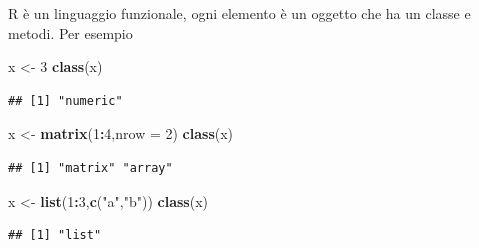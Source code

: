 \documentclass[
  11pt,
]{book}
\newenvironment{Shaded}{\begin{snugshade}}{\end{snugshade}}
\newcommand{\AttributeTok}[1]{\textcolor[rgb]{0.13,0.29,0.53}{#1}}
\newcommand{\DecValTok}[1]{\textcolor[rgb]{0.00,0.00,0.81}{#1}}
\newcommand{\FunctionTok}[1]{\textcolor[rgb]{0.13,0.29,0.53}{\textbf{#1}}}
\newcommand{\NormalTok}[1]{#1}
\newcommand{\OtherTok}[1]{\textcolor[rgb]{0.56,0.35,0.01}{#1}}
\newcommand{\SpecialCharTok}[1]{\textcolor[rgb]{0.81,0.36,0.00}{\textbf{#1}}}
\newcommand{\StringTok}[1]{\textcolor[rgb]{0.31,0.60,0.02}{#1}}
\theoremstyle{mytheoremstyle}
\theoremstyle{mydefstyle}
\begin{document}
R è un linguaggio funzionale, ogni elemento è un oggetto che ha un classe
e metodi. Per esempio

\begin{Shaded}
\begin{Highlighting}[]
\NormalTok{x }\OtherTok{\textless{}{-}} \DecValTok{3}
\FunctionTok{class}\NormalTok{(x)}
\end{Highlighting}
\end{Shaded}

\begin{verbatim}
## [1] "numeric"
\end{verbatim}

\begin{Shaded}
\begin{Highlighting}[]
\NormalTok{x }\OtherTok{\textless{}{-}} \FunctionTok{matrix}\NormalTok{(}\DecValTok{1}\SpecialCharTok{:}\DecValTok{4}\NormalTok{,}\AttributeTok{nrow =} \DecValTok{2}\NormalTok{)}
\FunctionTok{class}\NormalTok{(x)}
\end{Highlighting}
\end{Shaded}

\begin{verbatim}
## [1] "matrix" "array"
\end{verbatim}

\begin{Shaded}
\begin{Highlighting}[]
\NormalTok{x }\OtherTok{\textless{}{-}} \FunctionTok{list}\NormalTok{(}\DecValTok{1}\SpecialCharTok{:}\DecValTok{3}\NormalTok{,}\FunctionTok{c}\NormalTok{(}\StringTok{"a"}\NormalTok{,}\StringTok{"b"}\NormalTok{))}
\FunctionTok{class}\NormalTok{(x)}
\end{Highlighting}
\end{Shaded}

\begin{verbatim}
## [1] "list"
\end{verbatim}
\end{document}
